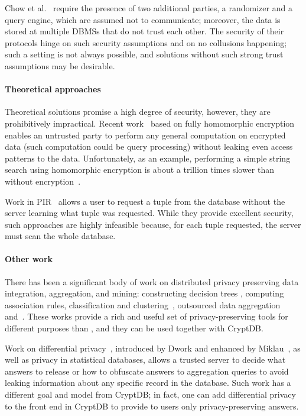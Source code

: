 Chow et al.~\cite{two-party-computation} require the presence of two
additional parties, a randomizer and a query engine, which are assumed
not to communicate; moreover, the data is stored at multiple DBMSs
that do not trust each other. The security of their protocols hinge on
such security assumptions and on no collusions happening; such a
setting is not always possible, and solutions without such strong
trust assumptions may be desirable.


\vspace{-0.2cm}
\paragraph{Theoretical approaches}
Theoretical solutions promise a high degree
of security, however, they are prohibitively impractical. Recent
work~\cite{gentryVerifiable} based on fully homomorphic
encryption~\cite{fullyHom} enables
an untrusted party to perform any general computation on encrypted data (such
computation could be query processing) without leaking even access patterns to
the data. Unfortunately, as an example, performing a simple string search using
homomorphic encryption is about a trillion times slower than without
encryption~\cite{trillion}.

Work in PIR~\cite{pir-survey} allows a user to request a tuple from the database
without the server learning what tuple was requested. While they provide
excellent security, such approaches are highly infeasible because, for each
tuple requested, the server must scan the whole database.

\paragraph{Other work} 
There has been a significant body of work on distributed privacy
preserving data integration, aggregation, and mining: constructing
decision trees \cite{Lindell-Pinkas-Secure-Data-Mining}, computing
association rules, classification and
clustering~\cite{Vaidya-Clifton-2002, Kantarcioglu-Clifton-2004,
  Kantarcioglu-Clifton-2005, Yang-2005}, outsourced data
aggregation~\cite{Xiong-2007}
and~\cite{Thompson_privacy-preservingcomputation}.  These works
provide a rich and useful set of privacy-preserving tools for
different purposes than \name, and they can be used together with
CryptDB\@.

Work on differential
privacy~\cite{dwork-survey,mcsherry:pinq,roy:airavat}, introduced by
Dwork and enhanced by Miklau~\cite{miklau-diff-private}, as well as
privacy in statistical databases, allows a trusted server to decide
what answers to release or how to obfuscate answers to aggregation
queries to avoid leaking information about any specific record in the
database. Such work has a different goal and model from CryptDB; in
fact, one can add differential privacy to the front end in CryptDB to
provide to users only privacy-preserving answers.
